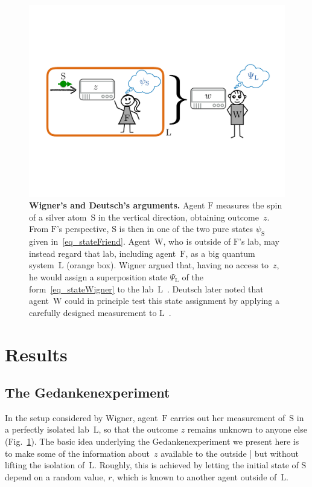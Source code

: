 \documentclass{article}
\theoremstyle{mystyle}
\theoremstyle{definition}
\newcommand*{\Friend}{\mathrm{F}}
\newcommand*{\Lab}{\mathrm{L}}
\newcommand*{\Labtwo}{\mathrm{L}}
\newcommand*{\Wigner}{\mathrm{W}}
\newcommand*{\Spin}{\mathrm{S}}
\begin{document}
  \begin{figure}[t]
\centering
\includegraphics[trim= 0.4cm  8.4cm 0cm 8cm, clip=true, scale=0.2]{WFStandardR.pdf}
\caption{{\bf Wigner's and Deutsch's arguments.} Agent $\Friend$ measures the spin of a silver atom~$\Spin$ in the vertical direction, obtaining outcome~$z$. From $\Friend$'s perspective, $\Spin$ is then in one of the two pure states  $\psi_{\Spin}$ given in~\eqref{eq_stateFriend}.  Agent~$\Wigner$, who is outside of $\Friend$'s lab, may instead regard that lab, including agent~$\Friend$, as a big quantum system~$\Lab$ (orange box). Wigner argued that, having no access to~$z$, he would assign a superposition state $\Psi_{\Lab}$ of the form~\eqref{eq_stateWigner} to the lab~$\Lab$~\cite{Wigner67}. Deutsch later noted that agent~$\Wigner$ could in principle test this state assignment by applying a carefully designed measurement to $\Lab$~\cite{Deutsch85}. 
\label{fig_WFStandard}
}
\end{figure} 

\section{Results}

\subsection{The Gedankenexperiment} \label{sec_experiment}

In the setup considered by Wigner,  agent~$\Friend$ carries out her measurement of~$\Spin$ in a perfectly isolated lab~$\Labtwo$, so that the outcome $z$ remains unknown to anyone else  (Fig.~\ref{fig_WFStandard}). The basic idea underlying the Gedankenexperiment we present here is to make some of the information about~$z$ available to the outside | but without lifting the isolation of~$\Labtwo$. Roughly, this is achieved by letting the initial state of $\Spin$ depend on a random value, $r$, which is known to another agent outside of~$\Labtwo$.
\end{document}
